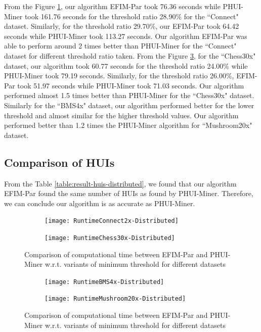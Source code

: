 \documentclass[11pt,openright]{report}
\begin{document}
From the Figure \ref{fig:graph-connect2x-distributed}, our algorithm EFIM-Par took 76.36 seconds while PHUI-Miner took 161.76 seconds for the threshold ratio 28.90\% for the ``Connect" dataset. Similarly, for the threshold ratio 29.70\%, our EFIM-Par took 64.42 seconds while PHUI-Miner took 113.27 seconds. Our algorithm EFIM-Par was able to perform around 2 times better than PHUI-Miner for the ``Connect" dataset for different threshold ratio taken. From the Figure \ref{fig:graph-chess30x-distributed}, for the ``Chess30x" dataset, our algorithm took 60.77 seconds for the threshold ratio 24.00\% while PHUI-Miner took 79.19 seconds. Similarly, for the threshold ratio 26.00\%, EFIM-Par took 51.97 seconds while PHUI-Miner took 71.03 seconds. Our algorithm performed almost 1.5 times better than PHUI-Miner for the ``Chess30x" dataset. Similarly for the ``BMS4x" dataset, our algorithm performed better for the lower threshold and almost similar for the higher threshold values. Our algorithm performed better than 1.2 times the PHUI-Miner algorithm for ``Mushroom20x" dataset.

\subsection{Comparison of HUIs}
From the Table \ref{table:result-huis-distributed}, we found that our algorithm EFIM-Par found the same number of HUIs as found by PHUI-Miner. Therefore, we can conclude our algorithm is as accurate as PHUI-Miner.

\begin{figure}
	\begin{subfigure}{\textwidth}
		\centering
		\texttt{[image: RuntimeConnect2x-Distributed]}
		\label{fig:graph-connect2x-distributed} 
		\bigskip
	\end{subfigure}    
	\begin{subfigure}{\textwidth}
		\centering
		\texttt{[image: RuntimeChess30x-Distributed]}
		\label{fig:graph-chess30x-distributed}
	\end{subfigure}
	\caption{Comparison of computational time between EFIM-Par and PHUI-Miner w.r.t. variants of minimum threshold for different datasets}
\end{figure}
\begin{figure} \ContinuedFloat
	\begin{subfigure}{\textwidth}
		\centering
		\texttt{[image: RuntimeBMS4x-Distributed]}
		\label{fig:graph-bms-distributed} 
		\bigskip
	\end{subfigure}
	\begin{subfigure}{\textwidth}
		\centering
		\texttt{[image: RuntimeMushroom20x-Distributed]}
		\label{fig:graph-mushroom20x-distributed} 
	\end{subfigure}
	\caption{Comparison of computational time between EFIM-Par and PHUI-Miner w.r.t. variants of minimum threshold for different datasets}
	\label{fig:graph-comparison-distributed}
\end{figure}
\end{document}
